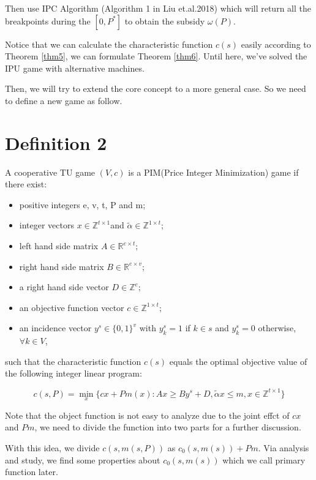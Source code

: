 \documentclass[UTF8]{article}
\begin{document}
Then use IPC Algorithm (Algorithm 1 in Liu et.al.2018) which will return all the breakpoints during the $[0, P^*]$ to obtain the subsidy $\omega(P)$.

Notice that we can calculate the characteristic function $c(s)$ easily according to Theorem \ref{thm5}, we can formulate Theorem \ref{thm6}. Until here, we've solved the IPU game with alternative machines.

Then, we will try to extend the core concept to a more general case. So we need to define a new game as follow.

\section*{Definition 2}

A cooperative TU game $(V,c)$ is a PIM(Price Integer Minimization) game if there exist:

\begin{itemize}
	\item positive integers e, v, t, P and m;
	\item integer vectors $ x \in \mathbb{Z}^{t \times 1} $and $ \tilde{\alpha} \in \mathbb{Z}^{1 \times t} $;
	\item left hand side matrix  $A \in \mathbb{R} ^{e \times t};$
	\item right hand side matrix $B \in \mathbb{R} ^ {e \times v};$
	\item a right hand side vector $D \in \mathbb{Z} ^ {e};$
	\item an objective function vector
	$c \in \mathbb{Z}^{1 \times t};$
	\item an incidence vector $y^s \in \{0,1\}^v$ with $y^s_k = 1$ if $k \in s$ and $y^s_k = 0 $ otherwise, $\forall k \in V$,

\end{itemize}

such that the characteristic function $c(s)$ equals the optimal objective value of the following integer linear program:

\[
c(s,P)= \mathop{\min}_{x} \{ cx+Pm(x): Ax \geq By^s+D, \tilde{\alpha}x \leq m, x \in \mathbb{Z}^{t \times 1} \}
\]

Note that the object function is not easy to analyze due to the joint effct of $cx$ and $Pm$, we need to divide the function into two parts for a further discussion.

With this idea, we divide $c(s,m(s,P))$ as $c_0(s,m(s))+Pm $. Via analysis and study, we find some properties about $c_0(s,m(s)) $ which we call primary function later.
\end{document}
